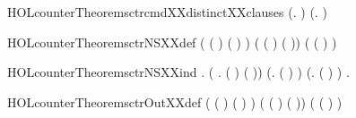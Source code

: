 \begin{SaveVerbatim}{HOLcounterTheoremsctrcmdXXdistinctXXclauses}
\HOLTokenTurnstile{} (\HOLSymConst{\HOLTokenForall{}}.   \HOLSymConst{\HOLTokenNotEqual{}} ) \HOLSymConst{\HOLTokenConj{}} (\HOLSymConst{\HOLTokenForall{}}.   \HOLSymConst{\HOLTokenNotEqual{}} ) \HOLSymConst{\HOLTokenConj{}}  \HOLSymConst{\HOLTokenNotEqual{}} 
\end{SaveVerbatim}
\newcommand{\HOLcounterTheoremsctrcmdXXdistinctXXclauses}{\UseVerbatim{HOLcounterTheoremsctrcmdXXdistinctXXclauses}}
\begin{SaveVerbatim}{HOLcounterTheoremsctrNSXXdef}
\HOLTokenTurnstile{} ( ( ) ( ) \HOLSymConst{=}  ) \HOLSymConst{\HOLTokenConj{}}
   ( ( )  \HOLSymConst{=}  ( \HOLSymConst{-} )) \HOLSymConst{\HOLTokenConj{}}
   ( ( )  \HOLSymConst{=}  )
\end{SaveVerbatim}
\newcommand{\HOLcounterTheoremsctrNSXXdef}{\UseVerbatim{HOLcounterTheoremsctrNSXXdef}}
\begin{SaveVerbatim}{HOLcounterTheoremsctrNSXXind}
\HOLTokenTurnstile{} \HOLSymConst{\HOLTokenForall{}}.
     (\HOLSymConst{\HOLTokenForall{}} .  ( ) ( )) \HOLSymConst{\HOLTokenConj{}} (\HOLSymConst{\HOLTokenForall{}}.  ( ) ) \HOLSymConst{\HOLTokenConj{}}
     (\HOLSymConst{\HOLTokenForall{}}.  ( ) ) \HOLSymConst{\HOLTokenImp{}}
     \HOLSymConst{\HOLTokenForall{}} .   
\end{SaveVerbatim}
\newcommand{\HOLcounterTheoremsctrNSXXind}{\UseVerbatim{HOLcounterTheoremsctrNSXXind}}
\begin{SaveVerbatim}{HOLcounterTheoremsctrOutXXdef}
\HOLTokenTurnstile{} ( ( ) ( ) \HOLSymConst{=}  ) \HOLSymConst{\HOLTokenConj{}}
   ( ( )  \HOLSymConst{=}  ( \HOLSymConst{-} )) \HOLSymConst{\HOLTokenConj{}}
   ( ( )  \HOLSymConst{=}  )
\end{SaveVerbatim}
